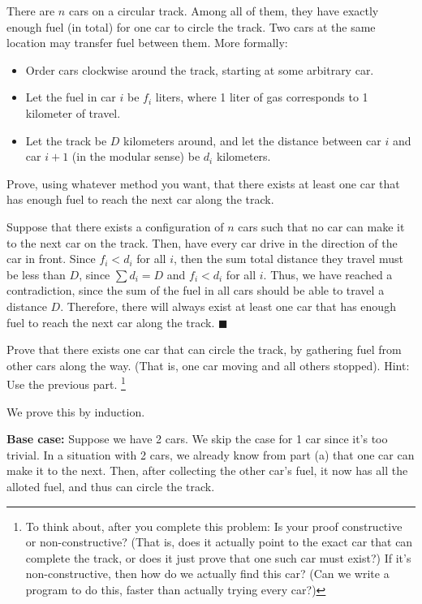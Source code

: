 \documentclass[11pt]{article}
\begin{document}
\pagebreak
{}
There are $n$ cars on a circular track. Among all of them, they have exactly
enough fuel (in total) for one car to circle the track. Two cars at the same
location may transfer fuel between them. More formally:
\begin{itemize}
		\item Order cars clockwise around the track, starting at some arbitrary
		car.
		\item Let the fuel in car $i$ be $f_i$ liters, where 1 liter of gas
				corresponds to 1 kilometer of travel.
		\item Let the track be $D$ kilometers around, and let the distance between car $i$ and car $i+1$ (in the modular sense) be $d_i$ kilometers.
\end{itemize}
\begin{Parts}
\Part Prove, using whatever method you want,
    that there exists at least one car that has enough fuel to reach
    the next car along the track.

    \begin{solution}
      Suppose that there exists a configuration of $n$ cars such that no car can make it to the next car on the track. Then, have every car drive in the direction of the car in front. Since $f_i < d_i$ for all $i$, then the sum total distance they travel must be less than $D$, since $\sum d_i = D$ and $f_i < d_i$ for all $i$. Thus, we have reached a contradiction, since the sum of the fuel in all cars should be able to travel a distance $D$. Therefore, there will always exist at least one car that has enough fuel to reach the next car along the track. $\blacksquare$
    \end{solution}
\Part Prove that there exists one car that can circle the track, by gathering fuel from other cars along the way. (That is, one car moving and all others stopped). Hint: Use the previous part. \footnote{
    To think about, after you complete this problem: Is your proof constructive or non-constructive? (That is, does it actually point to the exact car that can complete the track, or does it just prove that one such car must exist?) If it's non-constructive, then how do we actually find this car? (Can we write a program to do this, faster than actually trying every car?)}


    \begin{solution}
      We prove this by induction.

      \textbf{Base case:} Suppose we have 2 cars. We skip the case for 1 car since it's too trivial. In a situation with 2 cars, we already know from part (a) that one car can make it to the next. Then, after collecting the other car's fuel, it now has all the alloted fuel, and thus can circle the track.


\end{solution}
\end{Parts}
\end{document}
